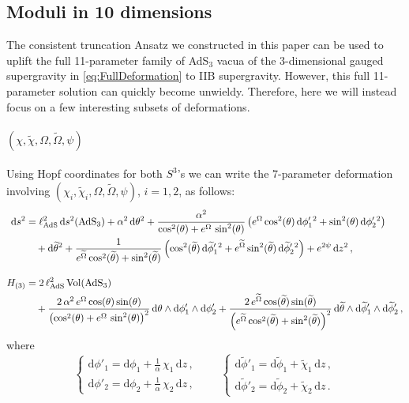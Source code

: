\documentclass[a4paper, 11pt]{article}
\numberwithin{equation}{section}
\newcommand{\ts}[1]{\widetilde{#1}}
\newcommand{\+}{\oplus}
\renewcommand{\d}{\ensuremath{\mathrm{d}}\xspace}
\begin{document}
\subsection{Moduli in 10 dimensions}
The consistent truncation Ansatz we constructed in this paper can be used to uplift the full 11-parameter family of AdS$_3$ vacua of the 3-dimensional gauged supergravity in \eqref{eq:FullDeformation} to IIB supergravity. However, this full 11-parameter solution can quickly become unwieldy. Therefore, here we will instead focus on a few interesting subsets of deformations.


\paragraph{\boldmath $(\chi, \ts{\chi}, \Omega, \ts{\Omega}, \psi)$}
Using Hopf coordinates for both $S^3$'s we can write the 7-parameter deformation involving $(\chi_i, \ts{\chi}_i, \Omega, \ts{\Omega}, \psi)$, $i = 1,2$, as follows:
\begin{equation} \label{eq:chiomegapsi}
	\begin{split}
		\d s^{2} &= \ell_{\rm AdS}^{2} \,\d s^{2}({\rm AdS}_{3}) + \alpha^{2}\,\d\theta^{2} +\frac{\alpha^{2}}{\cos^{2}(\theta)+e^{\Omega}\,\sin^{2}(\theta)}\left( e^{\Omega}\cos^{2}(\theta)\,\d\phi'_{1}{}^{2} + \sin^{2}(\theta)\,\d\phi'_{2}{}^{2} \right) \\
		&\quad +\d\ts{\theta}^{2} + \frac{1}{e^{\ts{\Omega}}\cos^{2}(\ts{\theta})+\sin^{2}(\ts{\theta})} \left(\cos^{2}(\ts{\theta})\,\d\ts{\phi}'_{1}{}^{2} + e^{\ts{\Omega}}\sin^{2}(\ts{\theta})\,\d\ts{\phi}'_{2}{}^{2}\right) + e^{2\psi}\,\d z^{2}\,, \\[10pt]
		H_{(3)} &= 2\,\ell_{\rm AdS}^{2}\,{\rm Vol}({\rm AdS_{3}}) \\
		&\quad + \frac{2\,\alpha^{2}\,e^{\Omega}\cos(\theta)\sin(\theta)}{\left(\cos^{2}(\theta)+e^{\Omega}\,\sin^{2}(\theta)\right)^{2}}\,\d\theta\wedge\d\phi'_{1}\wedge\d\phi'_{2}+ \frac{2\,e^{\ts{\Omega}}\cos(\ts{\theta})\sin(\ts{\theta})}{\left(e^{\ts{\Omega}}\cos^{2}(\ts{\theta})+\sin^{2}(\ts{\theta})\right)^{2}}\,\d\ts{\theta}\wedge\d\ts{\phi}'_{1}\wedge\d\ts{\phi}'_{2}\,,
	\end{split}
\end{equation}
where
\begin{equation}
	\begin{cases}
		\displaystyle \d\phi'_{1} = \d\phi_{1} + \frac{1}{\alpha}\,\chi_{1}\,\d z\,,\\[6pt]
		\displaystyle \d\phi'_{2} = \d\phi_{2} + \frac{1}{\alpha}\,\chi_{2}\,\d z\,,
	\end{cases}\qquad
	\begin{cases}
		\d\ts{\phi}'_{1} = \d\ts{\phi}_{1} + \ts{\chi}_{1}\,\d z\,,\\[6pt]
		\d\ts{\phi}'_{2} = \d\ts{\phi}_{2} + \ts{\chi}_{2}\,\d z\,.
	\end{cases}
\end{equation}
\end{document}
